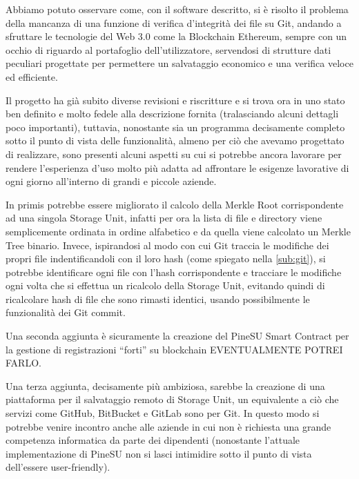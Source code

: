 \label{cap:sf}
Abbiamo potuto osservare come, con il software descritto, si è risolto il problema
della mancanza di una funzione di verifica d’integrità dei file su Git,
andando a sfruttare le tecnologie del Web 3.0 come la Blockchain Ethereum,
sempre con un occhio di riguardo al portafoglio dell’utilizzatore,
servendosi di strutture dati peculiari progettate per permettere un salvataggio economico
e una verifica veloce ed efficiente.

Il progetto ha già subito diverse revisioni e riscritture e si trova ora in uno
stato ben definito e molto fedele alla descrizione fornita
(tralasciando alcuni dettagli poco importanti), tuttavia, nonostante sia un programma
decisamente completo sotto il punto di vista delle funzionalità,
almeno per ciò che avevamo progettato di realizzare, sono presenti alcuni aspetti
su cui si potrebbe ancora lavorare per rendere l’esperienza d’uso molto più adatta
ad affrontare le esigenze lavorative di ogni giorno all’interno di grandi e piccole aziende.

In primis potrebbe essere migliorato il calcolo della Merkle Root corrispondente ad
una singola Storage Unit, infatti per ora la lista di file e directory viene semplicemente
ordinata in ordine alfabetico e da quella viene calcolato un Merkle Tree binario.
Invece, ispirandosi al modo con cui Git traccia le modifiche dei propri file
indentificandoli con il loro hash (come spiegato nella \autoref{sub:git}),
si potrebbe identificare ogni file con l’hash corrispondente e tracciare le modifiche
ogni volta che si effettua un ricalcolo della Storage Unit, evitando quindi di ricalcolare
hash di file che sono rimasti identici, usando possibilmente le funzionalità dei Git commit.

Una seconda aggiunta è sicuramente la creazione del PineSU Smart Contract per la gestione
di registrazioni “forti” su blockchain EVENTUALMENTE POTREI FARLO.

Una terza aggiunta, decisamente più ambiziosa, sarebbe la creazione di una piattaforma
per il salvataggio remoto di Storage Unit, un equivalente a ciò che servizi come GitHub,
BitBucket e GitLab sono per Git.
In questo modo si potrebbe venire incontro anche alle aziende in cui non è
richiesta una grande competenza informatica da parte dei dipendenti
(nonostante l’attuale implementazione di PineSU non si lasci intimidire sotto
il punto di vista dell’essere user-friendly).